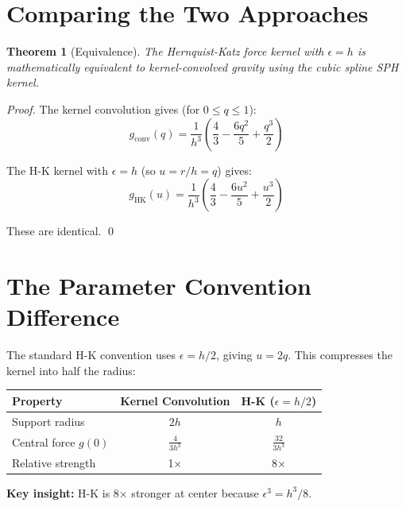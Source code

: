 \documentclass[12pt]{article}
\newtheorem{theorem}{Theorem}
\begin{document}
\section{Comparing the Two Approaches}

\begin{theorem}[Equivalence]
The Hernquist-Katz force kernel with $\epsilon = h$ is mathematically equivalent
to kernel-convolved gravity using the cubic spline SPH kernel.
\end{theorem}

\begin{proof}
The kernel convolution gives (for $0 \leq q \leq 1$):
\begin{equation}
g_{\text{conv}}(q) = \frac{1}{h^3}\left(\frac{4}{3} - \frac{6q^2}{5} + \frac{q^3}{2}\right)
\end{equation}

The H-K kernel with $\epsilon = h$ (so $u = r/h = q$) gives:
\begin{equation}
g_{\text{HK}}(u) = \frac{1}{h^3}\left(\frac{4}{3} - \frac{6u^2}{5} + \frac{u^3}{2}\right)
\end{equation}

These are identical. \qed
\end{proof}

\section{The Parameter Convention Difference}

The standard H-K convention uses $\epsilon = h/2$, giving $u = 2q$. This compresses
the kernel into half the radius:

\begin{table}[h]
\centering
\begin{tabular}{lcc}
\toprule
\textbf{Property} & \textbf{Kernel Convolution} & \textbf{H-K ($\epsilon = h/2$)} \\
\midrule
Support radius & $2h$ & $h$ \\
Central force $g(0)$ & $\frac{4}{3h^3}$ & $\frac{32}{3h^3}$ \\
Relative strength & 1× & 8× \\
\bottomrule
\end{tabular}
\end{table}

\textbf{Key insight:} H-K is 8× stronger at center because $\epsilon^3 = h^3/8$.

\end{document}
